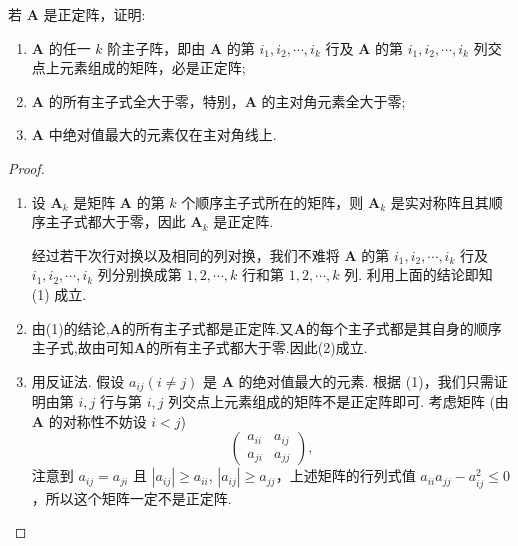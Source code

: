 \documentclass[../../main.tex]{subfiles}
\begin{document}
\begin{proposition}
若 $\boldsymbol{A}$ 是正定阵，证明:
\begin{enumerate}[(1)]
\item $\boldsymbol{A}$ 的任一 $k$ 阶主子阵，即由 $\boldsymbol{A}$ 的第 $i_1,i_2,\cdots,i_k$ 行及 $\boldsymbol{A}$ 的第 $i_1,i_2,\cdots,i_k$ 列交点上元素组成的矩阵，必是正定阵;

\item $\boldsymbol{A}$ 的所有主子式全大于零，特别，$\boldsymbol{A}$ 的主对角元素全大于零;

\item $\boldsymbol{A}$ 中绝对值最大的元素仅在主对角线上.
\end{enumerate} 
\end{proposition}
\begin{proof}
\begin{enumerate}[(1)]
\item 设 $\boldsymbol{A}_k$ 是矩阵 $\boldsymbol{A}$ 的第 $k$ 个顺序主子式所在的矩阵，则 $\boldsymbol{A}_k$ 是实对称阵且其顺序主子式都大于零，因此 $\boldsymbol{A}_k$ 是正定阵.

经过若干次行对换以及相同的列对换，我们不难将 $\boldsymbol{A}$ 的第 $i_1,i_2,\cdots,i_k$ 行及 $i_1,i_2,\cdots,i_k$ 列分别换成第 $1,2,\cdots,k$ 行和第 $1,2,\cdots,k$ 列. 利用上面的结论即知 (1) 成立.

\item 由(1)的结论,$\boldsymbol{A}$的所有主子式都是正定阵.又$\boldsymbol{A}$的每个主子式都是其自身的顺序主子式,故由可知$\boldsymbol{A}$的所有主子式都大于零.因此(2)成立.

\item 用反证法. 假设 $a_{ij}(i\neq j)$ 是 $\boldsymbol{A}$ 的绝对值最大的元素. 根据 (1)，我们只需证明由第 $i,j$ 行与第 $i,j$ 列交点上元素组成的矩阵不是正定阵即可. 考虑矩阵 (由 $\boldsymbol{A}$ 的对称性不妨设 $i < j$)
\[
\begin{pmatrix}
a_{ii} & a_{ij}\\
a_{ji} & a_{jj}
\end{pmatrix},
\]
注意到 $a_{ij} = a_{ji}$ 且 $|a_{ij}|\geq a_{ii}$, $|a_{ij}|\geq a_{jj}$，上述矩阵的行列式值 $a_{ii}a_{jj}-a_{ij}^2\leq 0$，所以这个矩阵一定不是正定阵. 
\end{enumerate}
\end{proof}
\end{document}
